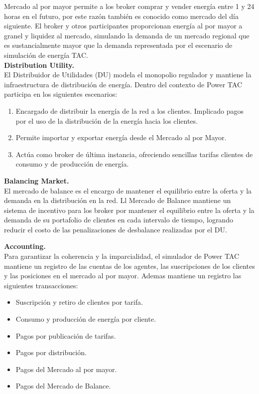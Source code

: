 Mercado al por mayor permite a los broker comprar y vender energía entre 1 y 24 horas en el  futuro, por este razón también es conocido como mercado del día siguiente. El broker y otros participantes proporcionan energía al por mayor a granel y liquidez al mercado, simulando la demanda de un mercado regional que es sustancialmente mayor que la demanda representada por el escenario de simulación de energía TAC.\\

\textbf{Distribution Utility.}\\

El Distribuidor de Utilidades (DU) modela el monopolio regulador y mantiene la infraestructura de distribución de energía. Dentro del contexto de Power TAC participa en los siguientes escenarios:

\begin{enumerate}
    \item Encargado de distribuir la energía de la red a los clientes. Implicado pagos por el uso de la distribución de la energía hacia los clientes.
    \item Permite importar y exportar energía desde el Mercado al por Mayor.
    \item Actúa como broker de última instancia, ofreciendo sencillas tarifas clientes de consumo y de producción de energía.
\end{enumerate}

\textbf{Balancing Market.}\\

El mercado de balance es el encargo de mantener el equilibrio entre la oferta y la demanda en la distribución en la red. Ll Mercado de Balance mantiene un sistema de incentivo para los broker por mantener el equilibrio entre la oferta y la demanda de su portafolio de clientes en cada intervalo de tiempo, logrando reducir el costo de las penalizaciones de desbalance realizadas por el DU.

\textbf{Accounting.}\\

Para garantizar la coherencia y la imparcialidad, el simulador de Power TAC mantiene un registro de las cuentas de los agentes, las suscripciones de los clientes y las posiciones en el mercado al por mayor. Ademas mantiene un registro las siguientes transacciones:

\begin{itemize}
    \item Suscripción y retiro de clientes por tarifa.
    \item Consumo y producción de energía por cliente.
    \item Pagos por publicación de tarifas.
    \item Pagos por distribución.
    \item Pagos del Mercado al por mayor.
    \item Pagos del Mercado de Balance.    
\end{itemize}

